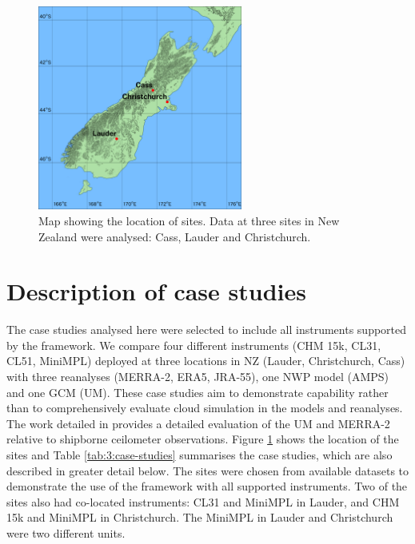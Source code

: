 \begin{figure}[t]
\centering
\includegraphics[width=0.6\textwidth]{chapter3/fig/map.png}
\caption[Map showing the location of sites]{Map showing the location of sites. Data at three sites in New Zealand
were analysed: Cass, Lauder and Christchurch.}
\label{fig:3:map}
\end{figure}

\section{Description of case studies}
\label{sec:3:case-studies}

The case studies analysed here were selected
to include all instruments supported by the framework. We compare four different
instruments (CHM 15k, CL31, CL51, MiniMPL) deployed at three locations in NZ
(Lauder, Christchurch, Cass) with three reanalyses (MERRA-2, ERA5, JRA-55),
one NWP model (AMPS) and one GCM (UM).
These case studies aim to demonstrate capability rather than to comprehensively evaluate cloud simulation in the
models and reanalyses. The work detailed in \cite{kuma2020a} provides a detailed evaluation of the UM and MERRA-2 relative to shipborne ceilometer observations.
Figure \ref{fig:3:map} shows the location of the sites and Table \ref{tab:3:case-studies}
summarises the case studies, which are also described in greater detail below.
The sites were chosen from available datasets to demonstrate the use of the
framework with all supported instruments. Two of the sites also had co-located
instruments: CL31 and MiniMPL in Lauder, and CHM 15k and MiniMPL in
Christchurch. The MiniMPL in Lauder and Christchurch were two different units.

